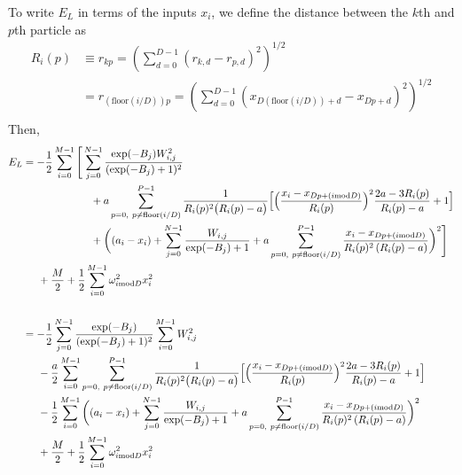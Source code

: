 \documentclass[12pt]{article}
\begin{document}
\noindent To write $E_L$ in terms of the inputs $x_i$, we define the distance between the $k$th and $p$th particle as
\begin{align*}
R_i(p) &\equiv r_{kp}= \left( \sum_{d=0}^{D-1} (r_{k,d}-r_{p,d})^2 \right)^{1/2}\\
 &= r_{(\text{floor}(i/D))p} 
 = \left( \sum_{d=0}^{D-1} (x_{D(\text{floor}(i/D))+d}-x_{Dp+d})^2 \right)^{1/2}\\
\end{align*}
\noindent Then,
\begin{align*}
E_L &= -\frac{1}{2} \sum_{i=0}^{M-1}
\Bigg[  \sum_{j=0}^{N-1} \frac{\exp(-B_j)W_{i,j}^2}{(\exp(-B_j)+1)^2}\\
& \hspace*{2.25 cm}
+ a \sum_{p=0, \ p\neq \text{floor}(i/D)}^{P-1}  \frac{1}{R_i(p)^2 \big( R_i(p)-a \big)}
\Big[ 
\Big( \frac{x_i-x_{Dp+(i\text{mod}D)}}{R_i(p)} \Big)^2 \frac{2a-3R_i(p)}{R_i(p)-a}
 +1
\Big]  \\
& \hspace*{2.25 cm}
+ \bigg( 
(a_i -x_i )
+\sum_{j=0}^{N-1}  \frac{W_{i,j}}{\exp(-B_j)+1}
+a\sum_{p=0, \ p\neq \text{floor}(i/D)}^{P-1} \frac{x_i-x_{Dp+(i\text{mod}D)}}{R_i(p)^2 \left( R_i(p) -a \right)}
 \bigg)^2  \Bigg]\\
& \hspace*{.5 cm} + \frac{M}{2}+ \frac{1}{2} \sum_{i=0}^{M-1} \omega_{i\text{mod}D}^2x_i^2\\ \\ 
&=-\frac{1}{2} \sum_{j=0}^{N-1}\frac{\exp(-B_j)}{(\exp(-B_j)+1)^2} \sum_{i=0}^{M-1}W_{i,j}^2 \\
& \hspace*{.5 cm}
-\frac{a}{2} \sum_{i=0}^{M-1} \sum_{p=0, \ p\neq \text{floor}(i/D)}^{P-1}\frac{1}{R_i(p)^2 \big( R_i(p)-a \big)}\Big[ \Big( \frac{x_i-x_{Dp+(i\text{mod}D)}}{R_i(p)} \Big)^2 \frac{2a-3R_i(p)}{R_i(p)-a}+1\Big]  \\
& \hspace*{.5 cm}
-\frac{1}{2} \sum_{i=0}^{M-1} \bigg( 
(a_i -x_i )
+\sum_{j=0}^{N-1}  \frac{W_{i,j}}{\exp(-B_j)+1}
+a\sum_{p=0, \ p\neq \text{floor}(i/D)}^{P-1} \frac{x_i-x_{Dp+(i\text{mod}D)}}{R_i(p)^2 \left( R_i(p) -a \right)}
 \bigg)^2\\
 & \hspace*{.5 cm} + \frac{M}{2}+\frac{1}{2} \sum_{i=0}^{M-1} \omega_{i\text{mod}D}^2x_i^2\\ \\ 

\end{align*}
\end{document}
